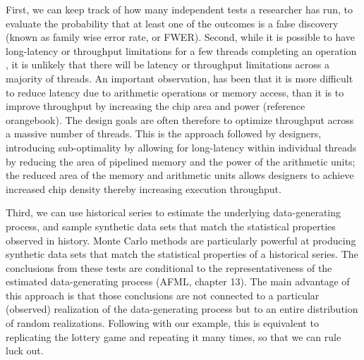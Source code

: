 \documentclass[10pt]{article}[draft]
\begin{document}
First, we can keep track of how many independent tests a researcher has run, to evaluate the probability that at least one of the outcomes is a false discovery (known as family wise error rate, or FWER). Second, while it is possible to have long-latency or throughput limitations for a few threads completing an operation , it is unlikely that there will be latency or throughput limitations across a majority of threads. An important observation, has been that it is more difficult to reduce latency due to arithmetic operations or memory access, than it is to improve throughput by increasing the chip area and power (reference orangebook). The design goals are often therefore to optimize throughput across a massive number of threads. This is the approach followed by designers, introducing sub-optimality by allowing for long-latency within individual threads by reducing the area of pipelined memory and the power of the arithmetic units; the reduced area of the memory and arithmetic units allows designers to achieve increased chip density thereby increasing execution throughput. 
		  
		  
Third, we can use historical series to estimate the underlying data-generating process, and sample synthetic data sets that match the statistical properties observed in history. Monte Carlo methods are particularly powerful at producing synthetic data sets that match the statistical properties of a historical series. The conclusions from these tests are conditional to the representativeness of the estimated data-generating process (AFML, chapter 13). The main advantage of this approach is that those conclusions are not connected to a particular (observed) realization of the data-generating process but to an entire distribution of random realizations. Following with our example, this is equivalent to replicating the lottery game and repeating it many times, so that we can rule luck out.
\end{document}
